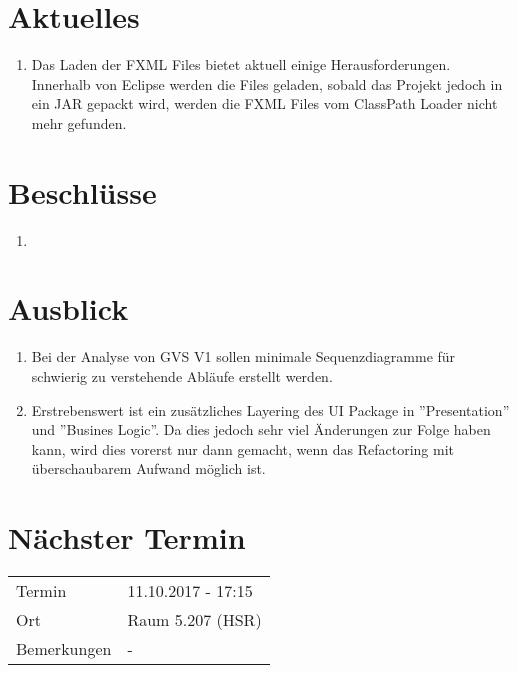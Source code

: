 \documentclass[11pt, a4paper,oneside]{scrartcl}
\begin{document}
\section{Aktuelles}
\begin{enumerate}
	\item Das Laden der FXML Files bietet aktuell einige Herausforderungen. Innerhalb von Eclipse werden die Files geladen, sobald das Projekt jedoch in ein JAR gepackt wird, werden die FXML Files vom ClassPath Loader nicht mehr gefunden.
\end{enumerate}

\section{Beschlüsse}
\begin{enumerate}
	\item
\end{enumerate}

\section{Ausblick}
\begin{enumerate}
	\item Bei der Analyse von GVS V1 sollen minimale Sequenzdiagramme für schwierig zu verstehende Abläufe erstellt werden.
	\item Erstrebenswert ist ein zusätzliches Layering des UI Package in ''Presentation'' und ''Busines Logic''. Da dies jedoch sehr viel Änderungen zur Folge haben kann, wird dies vorerst nur dann gemacht, wenn das Refactoring mit überschaubarem Aufwand möglich ist.
\end{enumerate}

\section{Nächster Termin}
\begin{tabu} to \linewidth {l X }
	\toprule
	Termin & 11.10.2017 - 17:15 \\
	Ort & Raum 5.207 (HSR) \\
	Bemerkungen & - \\
	\bottomrule
\end{tabu}
\end{document}
